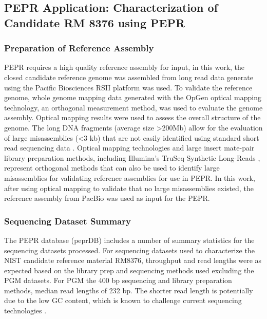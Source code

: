 \documentclass[smallextended]{svjour3}\usepackage[]{graphicx}\usepackage[]{color}
\begin{document}
\subsection{PEPR Application: Characterization of Candidate RM 8376 using PEPR}
\subsubsection{Preparation of Reference Assembly}
PEPR requires a high quality reference assembly for input, in this work, the closed candidate reference genome was assembled from long read data generate using the Pacific Biosciences RSII platform was used. To validate the reference genome, whole genome mapping data generated with the OpGen optical mapping technology, an orthogonal measurement method, was used to evaluate the genome assembly. Optical mapping results were used to assess the overall structure of the genome. The long DNA fragments (average size \textgreater 200Mb) allow for the evaluation of large misassemblies (\textless 3 kb) that are not easily identified using standard short read sequencing data \cite{Mendelowitz2014}.  Optical mapping technologies and large insert mate-pair library preparation methods, including Illumina's TruSeq Synthetic Long-Reads \cite{McCoy2014}, represent orthogonal methods that can also be used to identify large misassemblies for validating reference assemblies for use in PEPR.  In this work, after using optical mapping to validate that no large misassemblies existed, the reference assembly from PacBio was used as input for the PEPR. 

\subsubsection{Sequencing Dataset Summary}
The PEPR database (peprDB) includes a number of summary statistics for the sequencing datasets processed.  For sequencing datasets used to characterize the NIST candidate reference material RM8376, throughput and read lengths were as expected based on the library prep and sequencing methods used excluding the PGM datasets. For PGM the 400 bp sequencing and library preparation methods, median read lengths of 232 bp. The shorter read length is potentially due to the low GC content, which is known to challenge current sequencing technologies \cite{Quail2012}.  
\end{document}
